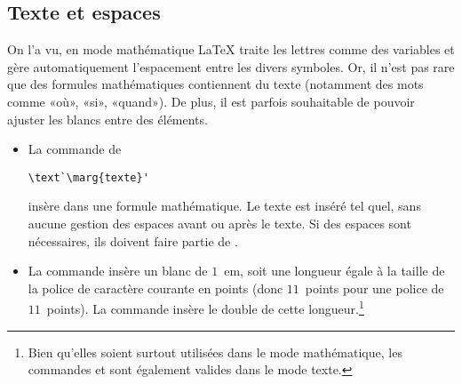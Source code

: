 \subsection{Texte et espaces}
\label{sec:math:bases:texte}

On l'a vu, en mode mathématique {\LaTeX} traite les lettres comme des
variables et gère automatiquement l'espacement entre les divers
symboles. Or, il n'est pas rare que des formules mathématiques
contiennent du texte (notamment des mots comme «où», «si», «quand»).
De plus, il est parfois souhaitable de pouvoir ajuster les blancs
entre des éléments.
\begin{itemize}
\item La commande de 
\begin{lstlisting}
\text`\marg{texte}'
\end{lstlisting}
  insère  dans une formule mathématique. Le texte est
  inséré tel quel, sans aucune gestion des espaces avant ou après le
  texte. Si des espaces sont nécessaires, ils doivent faire partie de
  .
\item La commande \cmd{\quad} insère un blanc de $1$~em, soit une
  longueur égale à la taille de la police de caractère courante en
  points (donc $11$~points pour une police de $11$~points). La
  commande \cmd{\qquad} insère le double de cette longueur.\footnote{%
    Bien qu'elles soient surtout utilisées dans le mode mathématique,
    les commandes \cmd{\quad} et \cmd{\qquad} sont également valides
    dans le mode texte.}
\end{itemize}
